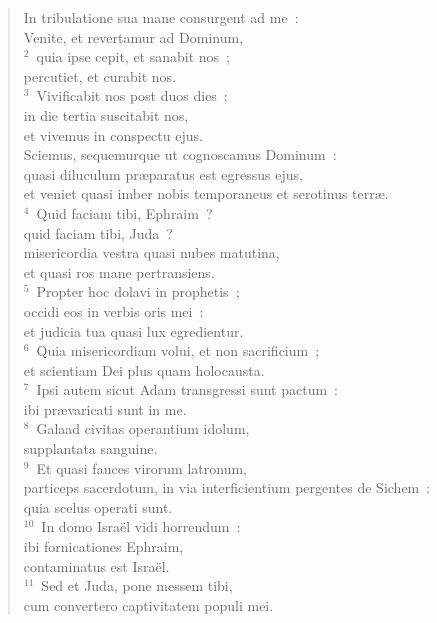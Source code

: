 \begin{flushleft}\begin{verse}\vspace{-19pt}In tribulatione sua mane consurgent ad me~:\\ Venite, et revertamur ad Dominum,\\
${}^{2}$~quia ipse cepit, et sanabit nos~;\\ percutiet, et curabit nos.\\
${}^{3}$~Vivificabit nos post duos dies~;\\ in die tertia suscitabit nos,\\ et vivemus in conspectu ejus.\\ Sciemus, sequemurque ut cognoscamus Dominum~:\\ quasi diluculum pr\ae paratus est egressus ejus,\\ et veniet quasi imber nobis temporaneus et serotinus terr\ae .\\
${}^{4}$~Quid faciam tibi, Ephraim~?\\ quid faciam tibi, Juda~?\\ misericordia vestra quasi nubes matutina,\\ et quasi ros mane pertransiens.\\
${}^{5}$~Propter hoc dolavi in prophetis~;\\ occidi eos in verbis oris mei~:\\ et judicia tua quasi lux egredientur.\\
${}^{6}$~Quia misericordiam volui, et non sacrificium~;\\ et scientiam Dei plus quam holocausta.\\
${}^{7}$~Ipsi autem sicut Adam transgressi sunt pactum~:\\ ibi pr\ae varicati sunt in me.\\
${}^{8}$~Galaad civitas operantium idolum,\\ supplantata sanguine.\\
${}^{9}$~Et quasi fauces virorum latronum,\\ particeps sacerdotum, in via interficientium pergentes de Sichem~:\\ quia scelus operati sunt.\\
${}^{10}$~In domo Isra\"el vidi horrendum~:\\ ibi fornicationes Ephraim,\\ contaminatus est Isra\"el.\\
${}^{11}$~Sed et Juda, pone messem tibi,\\ cum convertero captivitatem populi mei.\end{verse}\end{flushleft}


